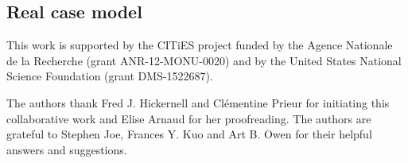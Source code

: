 \subsection{Real case model}
\label{sec:5.2}
%

\begin{acknowledgements}
This work is supported by the CITiES project funded by the Agence Nationale de la Recherche (grant ANR-12-\newline MONU-0020) and by the United States National Science Foundation (grant DMS-1522687).

The authors thank Fred J. Hickernell and Cl\'ementine Prieur for initiating this collaborative work and Elise Arnaud for her proofreading. The authors are grateful to Stephen Joe, Frances Y. Kuo and Art B. Owen for their helpful answers and suggestions.   
\end{acknowledgements}

